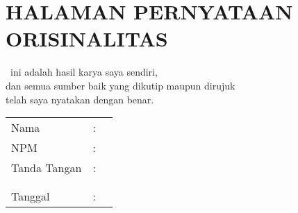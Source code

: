 %
%
%

\chapter*{\normalsize HALAMAN PERNYATAAN ORISINALITAS}
\vspace*{2cm}
\begin{doublespace}
\begin{center}
	\type~ini adalah hasil karya saya sendiri, \\
	dan semua sumber baik yang dikutip maupun dirujuk \\
	telah saya nyatakan dengan benar. \\
	\vspace*{2.6cm}
	
	\begin{tabular}{l c l}
	Nama & : & \penulis \\
	NPM & : & \npm \\
	Tanda Tangan & : & \\
	& & \\
	& & \\
	Tanggal & : & \tanggalPengesahan \\	
	\end{tabular}
\end{center}
\end{doublespace}

\newpage 